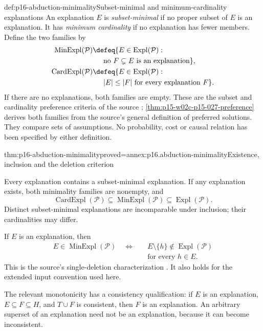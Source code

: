\begin{hbdefinition}{def:p16-abduction-minimality}{Subset-minimal and minimum-cardinality explanations}
An explanation \(E\) is \emph{subset-minimal} if no proper subset of
\(E\) is an explanation. It has \emph{minimum cardinality} if no
explanation has fewer members. Define the two families by
\[
\begin{aligned}
 \operatorname{MinExpl}(\mathcal P)
   &\defeq\{E\in\operatorname{Expl}(\mathcal P):\\
   &\hspace{1.5em}\text{no }F\subsetneq E\text{ is an explanation}\},\\
 \operatorname{CardExpl}(\mathcal P)
   &\defeq\{E\in\operatorname{Expl}(\mathcal P):\\
   &\hspace{1.5em}|E|\leq|F|\text{ for every explanation }F\}.
\end{aligned}
\]
If there are no explanations, both families are empty. These are the
subset and cardinality preference criteria of the source
\cite[def.~2.3 and following discussion, manuscript pp.~10--11]{EiterGottlobAbductionManuscript};
\cref{thm:p15-w02c-p15-027-preference} derives both families from the
source's general definition of preferred solutions.
They compare sets of assumptions. No probability, cost or causal relation
has been specified by either definition.
\end{hbdefinition}

\begin{hbtheorem}{thm:p16-abduction-minimality}{proved=annex:p16.abduction-minimality}{Existence, inclusion and the deletion criterion}
\par\nobreak
Every explanation contains a subset-minimal explanation. If any explanation
exists, both minimality families are nonempty, and
\[
 \operatorname{CardExpl}(\mathcal P)
        \subseteq\operatorname{MinExpl}(\mathcal P)
        \subseteq\operatorname{Expl}(\mathcal P).
\]
Distinct subset-minimal explanations are incomparable under inclusion;
their cardinalities may differ.

If \(E\) is an explanation, then
\[
\begin{aligned}
 E\in\operatorname{MinExpl}(\mathcal P)
 \quad\Longleftrightarrow\quad&
 E\setminus\{h\}\notin\operatorname{Expl}(\mathcal P)
                  \\
 &\text{for every }h\in E.
\end{aligned}
\]
This is the source's single-deletion characterization
\cite[prop.~2.1, p.~11]{EiterGottlobAbductionManuscript}.
It also holds for the extended input convention used here.

The relevant monotonicity has a consistency qualification: if \(E\) is
an explanation, \(E\subseteq F\subseteq H\), and \(T\cup F\) is
consistent, then \(F\) is an explanation. An arbitrary superset of an
explanation need not be an explanation, because it can become inconsistent.
\end{hbtheorem}

